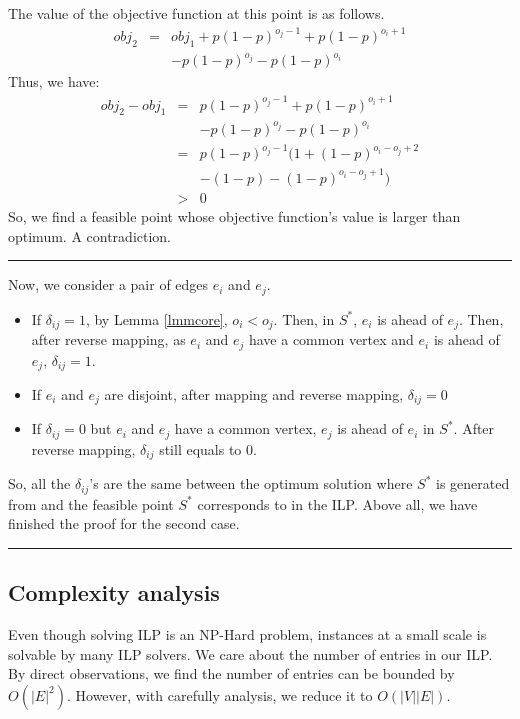 \documentclass[letterpaper]{article}
\newenvironment{proof}{{Proof:}}{\hfill\rule{2mm}{2mm}}
\begin{document}
\begin{proof}
\begin{proof}
		The value of the objective function at this point is as follows.
		\begin{eqnarray}
		obj_2&=& obj_1+p(1-p)^{o_j-1}+p(1-p)^{o_i+1}\nonumber\\&&-p(1-p)^{o_j}-p(1-p)^{o_i}
		\end{eqnarray} 
		Thus, we have:
		\begin{eqnarray}
		obj_2-obj_1&=& p(1-p)^{o_j-1}+p(1-p)^{o_i+1}\nonumber\\&&-p(1-p)^{o_j}-p(1-p)^{o_i}\nonumber\\
		&=& p(1-p)^{o_j-1}(1+(1-p)^{o_i-o_j+2}\nonumber\\&& -(1-p)-(1-p)^{o_i-o_j+1})\nonumber\\
		&>& 0\nonumber
		\end{eqnarray}
		So, we find a feasible point whose objective function's value is larger than optimum.
		A contradiction.
	\end{proof}
	Now, we consider a pair of edges $e_i$ and $e_j$. 
	\begin{itemize}
		\item If $\delta_{ij}=1$, by Lemma \ref{lmmcore}, $o_i<o_j$. 
		Then, in $S^*$, $e_i$ is ahead of $e_j$.
		Then, after reverse mapping, as $e_i$ and $e_j$ have a common vertex and $e_i$ is ahead of $e_j$, $\delta_{ij}=1$.
		\item If $e_i$ and $e_j$ are disjoint, after mapping and reverse mapping, $\delta_{ij}=0$
		\item If $\delta_{ij}=0$ but $e_i$ and $e_j$ have a common vertex, $e_j$ is ahead of $e_i$ in $S^*$.
		After reverse mapping, $\delta_{ij}$ still equals to 0.
	\end{itemize}
	So, all the $\delta_{ij}$'s are the same between the optimum solution where $S^*$ is generated from and the feasible point $S^*$ corresponds to in the ILP.
	Above all, we have finished the proof for the second case. 
\end{proof}

\subsection{Complexity analysis}

Even though solving ILP is an NP-Hard problem, instances at a small scale is solvable by many ILP solvers.
We care about the number of entries in our ILP.
By direct observations, we find the number of entries can be bounded by $O(|E|^2)$.
However, with carefully analysis, we reduce it to $O(|V||E|)$.
\end{document}
